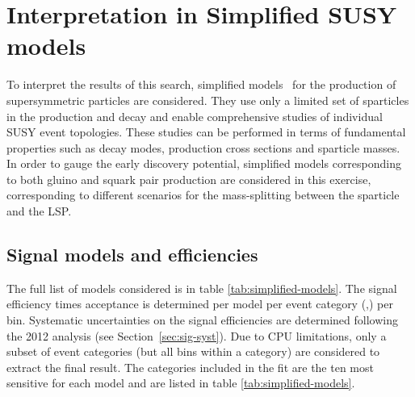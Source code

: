 \section{Interpretation in Simplified SUSY models}
\label{sec:susy}
To interpret the results of this search, simplified
models~\cite{Alwall:2008ag,Alwall:2008va,sms} for the production of supersymmetric particles are considered. 
They use only a limited set of sparticles in the production and
decay and enable comprehensive studies of individual SUSY event
topologies. These studies can be performed in terms of
fundamental properties such as decay modes, production cross sections and sparticle masses. 
In order to gauge the early discovery potential, simplified models corresponding to both gluino and squark pair production 
are considered in this exercise, corresponding to different scenarios for the mass-splitting between the sparticle and the LSP. 

\subsection{Signal models and efficiencies}
\label{subsec:susy_models}

The full list of models considered is in table \ref{tab:simplified-models}. 
The signal efficiency times acceptance is determined per model per event
category (\njet,\nb) per \HT bin. 
Systematic uncertainties on the signal efficiencies are determined 
following the 2012 analysis (see Section~\ref{sec:sig-syst}). Due to CPU
limitations, only a subset of event categories (but all \scalht bins
within a category) are considered to extract the final result. 
The categories included in the fit are the ten most sensitive 
for each model and are listed in table \ref{tab:simplified-models}. 

